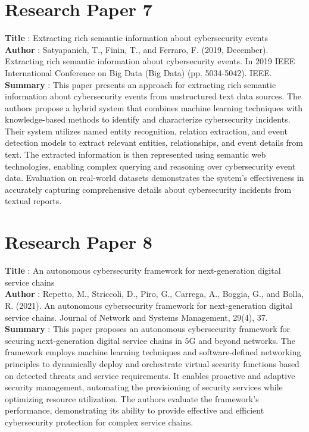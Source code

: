 \newpage
\section{Research Paper 7}
\textbf{Title} : Extracting rich semantic information about cybersecurity events
\\
\textbf{Author} : Satyapanich, T., Finin, T., and Ferraro, F. (2019, December). Extracting rich semantic information about cybersecurity events. In 2019 IEEE International Conference on Big Data (Big Data) (pp. 5034-5042). IEEE.
\\
\textbf{Summary} : This paper presents an approach for extracting rich semantic information about cybersecurity events from unstructured text data sources. The authors propose a hybrid system that combines machine learning techniques with knowledge-based methods to identify and characterize cybersecurity incidents. Their system utilizes named entity recognition, relation extraction, and event detection models to extract relevant entities, relationships, and event details from text. The extracted information is then represented using semantic web technologies, enabling complex querying and reasoning over cybersecurity event data. Evaluation on real-world datasets demonstrates the system's effectiveness in accurately capturing comprehensive details about cybersecurity incidents from textual reports.

\section{Research Paper 8}
\textbf{Title} : An autonomous cybersecurity framework for next-generation digital service chains
\\
\textbf{Author} : Repetto, M., Striccoli, D., Piro, G., Carrega, A., Boggia, G., and Bolla, R. (2021). An autonomous cybersecurity framework for next-generation digital service chains. Journal of Network and Systems Management, 29(4), 37.
\\
\textbf{Summary} : This paper proposes an autonomous cybersecurity framework for securing next-generation digital service chains in 5G and beyond networks. The framework employs machine learning techniques and software-defined networking principles to dynamically deploy and orchestrate virtual security functions based on detected threats and service requirements. It enables proactive and adaptive security management, automating the provisioning of security services while optimizing resource utilization. The authors evaluate the framework's performance, demonstrating its ability to provide effective and efficient cybersecurity protection for complex service chains.

